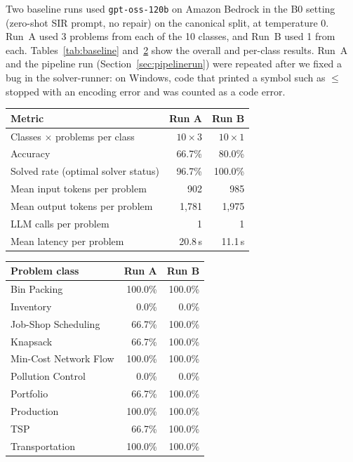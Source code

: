 \documentclass[11pt,a4paper]{article}
\begin{document}
Two baseline runs used \texttt{gpt-oss-120b} on Amazon Bedrock in the B0 setting (zero-shot SIR prompt, no repair) on the canonical split, at temperature 0. Run~A used 3 problems from each of the 10 classes, and Run~B used 1 from each. Tables~\ref{tab:baseline} and~\ref{tab:perclass} show the overall and per-class results. Run~A and the pipeline run (Section~\ref{sec:pipelinerun}) were repeated after we fixed a bug in the solver-runner: on Windows, code that printed a symbol such as $\leq$ stopped with an encoding error and was counted as a code error.

\begin{table}[htbp]
\centering
\begin{minipage}[t]{0.53\textwidth}
\centering
{}
\label{tab:baseline}
\footnotesize
\begin{tabular}{@{}lrr@{}}
\toprule
\textbf{Metric} & \textbf{Run A} & \textbf{Run B}\\
\midrule
Classes $\times$ problems per class & $10 \times 3$ & $10 \times 1$\\
Accuracy & 66.7\% & 80.0\%\\
Solved rate (optimal solver status) & 96.7\% & 100.0\%\\
Mean input tokens per problem & 902 & 985\\
Mean output tokens per problem & 1,781 & 1,975\\
LLM calls per problem & 1 & 1\\
Mean latency per problem & 20.8\,s & 11.1\,s\\
\bottomrule
\end{tabular}
\end{minipage}\hfill
\begin{minipage}[t]{0.43\textwidth}
\centering
{}
\label{tab:perclass}
\footnotesize
\begin{tabular}{@{}lrr@{}}
\toprule
\textbf{Problem class} & \textbf{Run A} & \textbf{Run B}\\
\midrule
Bin Packing & 100.0\% & 100.0\%\\
Inventory & 0.0\% & 0.0\%\\
Job-Shop Scheduling & 66.7\% & 100.0\%\\
Knapsack & 66.7\% & 100.0\%\\
Min-Cost Network Flow & 100.0\% & 100.0\%\\
Pollution Control & 0.0\% & 0.0\%\\
Portfolio & 66.7\% & 100.0\%\\
Production & 100.0\% & 100.0\%\\
TSP & 66.7\% & 100.0\%\\
Transportation & 100.0\% & 100.0\%\\
\bottomrule
\end{tabular}
\end{minipage}
\end{table}
\end{document}
